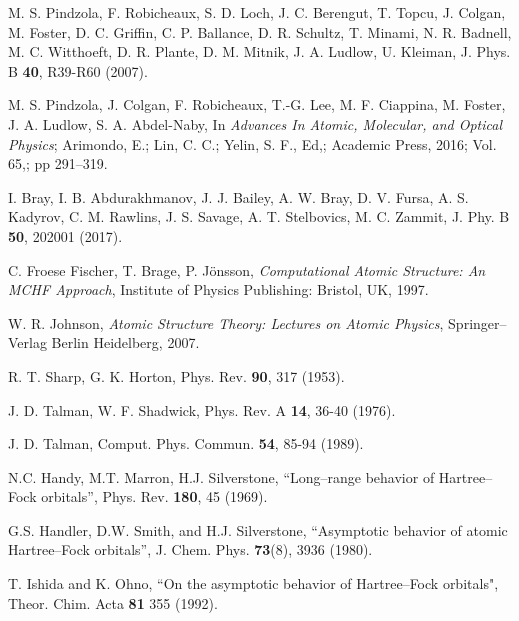 \begin{thebibliography}{9}
M. S. Pindzola, F. Robicheaux, S. D. Loch, J. C. Berengut, T. Topcu, 
J. Colgan, M. Foster, D. C. Griffin, C. P. Ballance, D. R. Schultz,
T. Minami, N. R. Badnell, M. C. Witthoeft, D. R. Plante, D. M. Mitnik, 
J. A. Ludlow, U. Kleiman, 
J. Phys. B \textbf{40}, R39-R60 (2007).

M. S. Pindzola, J. Colgan, F. Robicheaux, T.-G. Lee, M. F. Ciappina,
M. Foster, J. A. Ludlow, S. A. Abdel-Naby,
In \textit{Advances In Atomic, Molecular, and Optical Physics};
Arimondo, E.; Lin, C. C.; Yelin, S. F., Ed,; 
Academic Press, 2016; Vol. 65,; pp 291--319.


I. Bray, I. B. Abdurakhmanov, J. J. Bailey, A. W. Bray, D. V. Fursa,
A. S. Kadyrov, C. M. Rawlins, J. S. Savage, A. T. Stelbovics, M. C. Zammit,
J. Phy. B \textbf{50}, 202001 (2017).


C. Froese Fischer, T. Brage, P. J\"onsson,
\textit{Computational Atomic Structure: An MCHF Approach},
Institute of Physics Publishing: Bristol, UK, 1997.

W. R. Johnson, 
\textit{Atomic Structure Theory: Lectures on Atomic Physics},
Springer--Verlag Berlin Heidelberg, 2007.

R. T. Sharp, G. K. Horton,
Phys. Rev. \textbf{90}, 317 (1953).

J. D. Talman, W. F. Shadwick, 
Phys. Rev. A \textbf{14}, 36-40 (1976).

J. D. Talman, 
Comput. Phys. Commun. \textbf{54}, 85-94 (1989).


N.C. Handy, M.T. Marron, H.J. Silverstone, 
``Long--range behavior of Hartree--Fock orbitals'',
Phys. Rev. {\bf 180}, 45 (1969).

G.S. Handler, D.W. Smith, and H.J. Silverstone, 
``Asymptotic behavior of atomic Hartree--Fock orbitals'',
J. Chem. Phys. {\bf 73}(8), 3936 (1980).

T. Ishida and K. Ohno, 
``On the asymptotic behavior of Hartree--Fock orbitals", 
Theor. Chim. Acta {\bf 81} 355 (1992).


\end{thebibliography}
